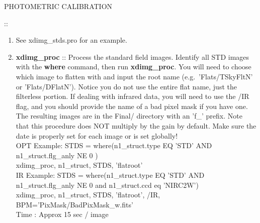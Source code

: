 \documentclass[11pt,letterpaper,dvips]{article}
\begin{document}
\begin{enumerate}
{\Large  \item PHOTOMETRIC CALIBRATION} :: \\

	\begin{enumerate}

	  \item See xdimg\_stds.pro for an example.
	  \item {\bf xdimg\_proc } :: Process the standard field
            images.  Identify all STD images with the {\bf where}
            command, then run {\bf xdimg\_proc}.  You will need to
            choose which image to flatten with and input the root name
            (e.g.\ 'Flats/TSkyFltN' or 'Flats/DFlatN').  Notice you do
            not use the entire flat name, just the filterless portion.
            If dealing with infrared data, you will need to use the
            /IR flag, and you should provide the name of a bad pixel
            mask if you have one.  The resulting images are in the
            Final/ directory with an 'f\_' prefix.  Note that this
            procedure does NOT multiply by the gain by default.  Make
            sure the date is properly set for each image or is set globally! \\
            \quad OPT Example: STDS = where(n1\_struct.type EQ 'STD' AND
            n1\_struct.flg\_anly NE 0 ) \\
            \quad\quad\quad xdimg\_proc, n1\_struct, STDS, 'flatroot' \\
            \quad IR Example: STDS = where(n1\_struct.type EQ 'STD' AND n1\_struct.flg\_anly NE 0 and n1\_struct.ccd eq 'NIRC2W') \\
            \quad\quad\quad xdimg\_proc, n1\_struct, STDS, 'flatroot', /IR, BPM='PixMask/BadPixMask\_w.fits' \\
            \quad Time : Approx 15 sec / image
	        

\end{enumerate}
\end{enumerate}
\end{document}
